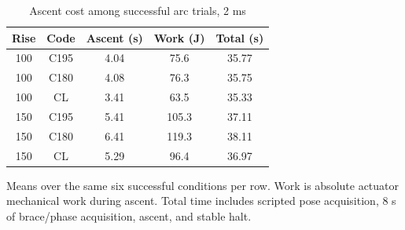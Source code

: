 \begin{table}[t]\centering\small
\caption{Ascent cost among successful arc trials, 2 ms}
\label{tab:cost}\begin{tabular}{ccccc}\toprule
Rise & Code & Ascent (s) & Work (J) & Total (s)\\\midrule
100 & C195 & 4.04 & 75.6 & 35.77\\
100 & C180 & 4.08 & 76.3 & 35.75\\
100 & CL & 3.41 & 63.5 & 35.33\\
150 & C195 & 5.41 & 105.3 & 37.11\\
150 & C180 & 6.41 & 119.3 & 38.11\\
150 & CL & 5.29 & 96.4 & 36.97\\
\bottomrule\end{tabular}
\par\vspace{4pt}\noindent\parbox{\columnwidth}{\footnotesize Means over the same six successful conditions per row. Work is absolute actuator mechanical work during ascent. Total time includes scripted pose acquisition, 8 s of brace/phase acquisition, ascent, and stable halt.}
\end{table}